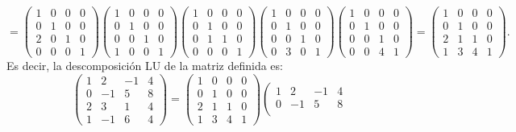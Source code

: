 \documentclass[11pt,letterpaper]{article}
\begin{document}
\begin{enumerate}
$$=\left(\begin{array}{cccc}
1&0&0&0\\
0&1&0&0\\
2&0&1&0\\
0&0&0&1
\end{array}\right)\left(\begin{array}{cccc}
1&0&0&0\\
0&1&0&0\\
0&0&1&0\\
1&0&0&1
\end{array} \right)\left(\begin{array}{cccc}
1&0&0&0\\
0&1&0&0\\
0&1&1&0\\
0&0&0&1
\end{array} \right)\left(\begin{array}{cccc}
1&0&0&0\\
0&1&0&0\\
0&0&1&0\\
0&3&0&1
\end{array} \right)\left(\begin{array}{cccc}
1&0&0&0\\
0&1&0&0\\
0&0&1&0\\
0&0&4&1
\end{array} \right)=\left(
\begin{array}{rrrr}
 1 &  0 & 0 &  0\\
 0 &  1 & 0 &  0\\
 2 &  1 & 1 &  0\\
 1 &  3 & 4 &  1
\end{array}\right).$$
Es decir, la descomposición LU de la matriz definida es:
$$
\left(\begin{array}{rrrr}
 1 &  2 & -1 & 4\\
 0 & -1 &  5 & 8\\
 2 &  3 &  1 & 4\\
 1 & -1 &  6 & 4
\end{array} \right)=\left(
\begin{array}{rrrr}
 1 &  0 & 0 &  0\\
 0 &  1 & 0 &  0\\
 2 &  1 & 1 &  0\\
 1 &  3 & 4 &  1
\end{array}\right)\left(
\begin{array}{rrrr}
 1 &  2 & -1 &   4\\
 0 & -1 &  5 &   8\\

\end{array}$$
\end{enumerate}
\end{document}
